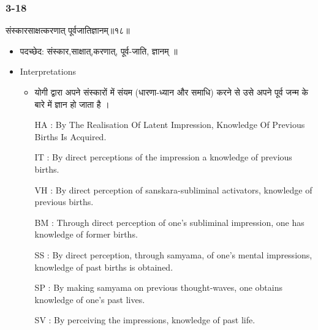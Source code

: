 \begin{frame}[fragile]\frametitle{3-18}
\begin{sanskrit}
संस्कारसाक्षत्करणात् पूर्वजातिज्ञानम्॥१८॥
\end{sanskrit}

	\begin{itemize}
	\item पदच्छेद:  संस्कार,साक्षात्,करणात्, पूर्व-जाति, ज्ञानम् ॥
	\item Interpretations
		\begin{itemize}	
		\item  योगी द्वारा अपने संस्कारों में संयम (धारणा-ध्यान और समाधि) करने से उसे अपने पूर्व जन्म के बारे में ज्ञान हो जाता है ।
		\item [HA]: By The Realisation Of Latent Impression, Knowledge Of Previous Births Is Acquired.
		\item [IT]: By direct perceptions of the impression a knowledge of previous births.
		\item [VH]: By direct perception of sanskara-subliminal activators, knowledge of previous births.
		\item [BM]: Through direct perception of one’s subliminal impression, one has knowledge of former births.
		\item [SS]: By direct perception, through samyama, of one’s mental impressions, knowledge of past births is obtained.
		\item [SP]: By making samyama on previous thought-waves, one obtains knowledge of one’s past lives.
		\item [SV]: By perceiving the impressions, knowledge of past life. 
		\end{itemize}
	\end{itemize}
\end{frame}

